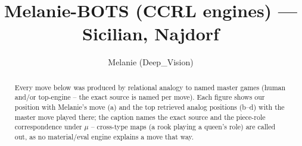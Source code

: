 \documentclass[11pt]{article}
\title{Melanie-BOTS (CCRL engines) — Sicilian, Najdorf}
\author{Melanie (Deep\_Vision)}
\date{}
\begin{document}
\maketitle

\begin{abstract}Every move below was produced by relational analogy to named master games (human and/or top-engine -- the exact source is named per move). Each figure shows our position with Melanie's move (a) and the top retrieved analog positions (b--d) with the master move played there; the caption names the exact source and the piece-role correspondence under $\mu$ -- cross-type maps (a rook playing a queen's role) are called out, as no material/eval engine explains a move that way.\end{abstract}

\begin{figure}[p]\centering
\begin{subfigure}{0.46\textwidth}\centering
\resizebox{\linewidth}{!}{%
\newchessgame
\chessboard[
  setfen={rnbqkb1r/1p3ppp/p2p1n2/4p3/3NP3/2N5/PPP1BPPP/R1BQ1RK1 b kq - 1 7},
  showmover=false,
  pgfstyle=straightmove, color=movearrow, markmove={f8-e7}
]}
\caption{}
\end{subfigure}\hfill
\begin{subfigure}{0.46\textwidth}\centering
\resizebox{\linewidth}{!}{%
\newchessgame
\chessboard[
  setfen={r1bqkb1r/pp3ppp/2nppn2/8/3NP3/2N5/PPP1BPPP/R1BQ1RK1 b kq - 1 7},
  showmover=false,
  pgfstyle=straightmove, color=movearrow, markmove={f8-e7}
]}
\caption{}
\end{subfigure}
\\[4pt]
\begin{subfigure}{0.46\textwidth}\centering
\resizebox{\linewidth}{!}{%
\newchessgame
\chessboard[
  setfen={r1bqkb1r/pp3ppp/2nppn2/8/3NP3/2N5/PPP1BPPP/R1BQ1RK1 b kq - 1 7},
  showmover=false,
  pgfstyle=straightmove, color=movearrow, markmove={f8-e7}
]}
\caption{}
\end{subfigure}\hfill
\begin{subfigure}{0.46\textwidth}\centering
\resizebox{\linewidth}{!}{%
\newchessgame
\chessboard[
  setfen={r1bqkb1r/pp3ppp/2nppn2/8/3NP3/2N5/PPP1BPPP/R1BQ1RK1 b kq - 3 7},
  showmover=false,
  pgfstyle=straightmove, color=movearrow, markmove={f8-e7}
]}
\caption{}
\end{subfigure}

\end{figure}
\end{document}
